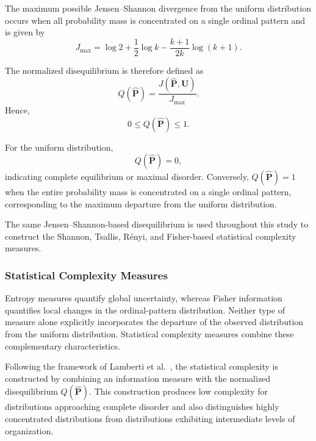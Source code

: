 \documentclass[11pt,a4paper]{article}
\begin{document}
The maximum possible Jensen--Shannon divergence from the uniform distribution occurs when all probability mass is concentrated on a single ordinal pattern and is given by
\begin{equation}
	J_{\max}
	=
	\log 2
	+
	\frac{1}{2}\log k
	-
	\frac{k+1}{2k}\log(k+1).
\end{equation}

The normalized disequilibrium is therefore defined as
\begin{equation}
	Q(\widehat{\mathbf{P}})
	=
	\frac{
		J(\widehat{\mathbf{P}},\mathbf{U})
	}{
		J_{\max}
	}.
\end{equation}
Hence,
\begin{equation}
	0\leq Q(\widehat{\mathbf{P}})\leq1.
\end{equation}

For the uniform distribution,
\begin{equation}
	Q(\widehat{\mathbf{P}})=0,
\end{equation}
indicating complete equilibrium or maximal disorder. Conversely, $Q(\widehat{\mathbf{P}})=1$ when the entire probability mass is concentrated on a single ordinal pattern, corresponding to the maximum departure from the uniform distribution.

The same Jensen--Shannon-based disequilibrium is used throughout this study to construct the Shannon, Tsallis, R\'enyi, and Fisher-based statistical complexity measures.


\subsubsection{Statistical Complexity Measures}
\label{complexity-measures}

Entropy measures quantify global uncertainty, whereas Fisher information quantifies local changes in the ordinal-pattern distribution. Neither type of measure alone explicitly incorporates the departure of the observed distribution from the uniform distribution. Statistical complexity measures combine these complementary characteristics.

Following the framework of Lamberti et al.~\cite{lamberti2004intensive}, the statistical complexity is constructed by combining an information measure with the normalized disequilibrium $Q(\widehat{\mathbf{P}})$. This construction produces low complexity for distributions approaching complete disorder and also distinguishes highly concentrated distributions from distributions exhibiting intermediate levels of organization.
\end{document}
